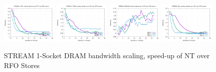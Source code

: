 \documentclass{article}
\begin{document}
\begin{figure}[!ht]
    \centering
    \includegraphics[width=0.24\textwidth]{../data/icx-32c-snc/mem_bw_scale/mb_scale_compact_Copy_nt_rfo}
    \includegraphics[width=0.24\textwidth]{../data/icx-32c-snc/mem_bw_scale/mb_scale_compact_Triad_nt_rfo}
    \includegraphics[width=0.24\textwidth]{../data/icx-32c-snc/mem_bw_scale/mb_scale_compact_Reduce_nt_rfo}
    \includegraphics[width=0.24\textwidth]{../data/icx-32c-snc/mem_bw_scale/mb_scale_compact_Fill_nt_rfo}
    \caption{STREAM 1-Socket DRAM bandwidth scaling, speed-up of NT over RFO Stores}
    \label{figure:mem_bw_scale_compact_nt_rfo_icx_snc}
\end{figure}
\end{document}
